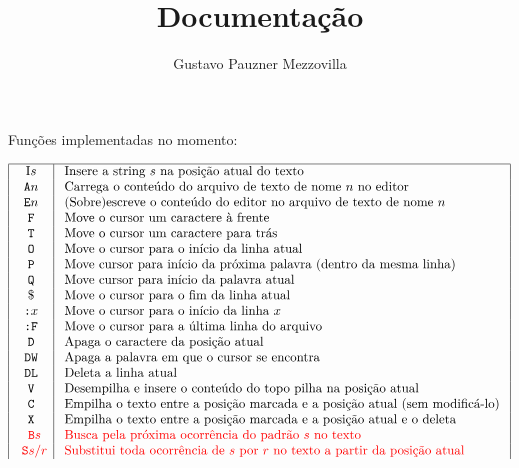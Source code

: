 \documentclass{article}
\title{Documentação}
\author{Gustavo Pauzner Mezzovilla}
\begin{document}
\maketitle

Funções implementadas no momento:

$$
\begin{array}{|c|l|}
\hline \text {I}s & \text { Insere a string } s \text { na posição atual do texto } \\
\texttt {A}n & \text { Carrega o conteúdo do arquivo de texto de nome } n \text { no editor } \\
\texttt{E}n & \text { (Sobre)escreve o conteúdo do editor no arquivo de texto de nome } n \\
\texttt{ F } & \text { Move o cursor um caractere à frente } \\
\texttt{ T } & \text { Move o cursor um caractere para trás } \\
\texttt{O} & \text { Move o cursor para o início da linha atual } \\
\texttt{P} & \text { Move cursor para início da próxima palavra (dentro da mesma linha) } \\
\texttt{ Q } & \text { Move cursor para início da palavra atual } \\
\$ & \text { Move o cursor para o fim da linha atual } \\
\texttt{:}x & \text { Move o cursor para o início da linha } x \\
\texttt{:F} & \text { Move o cursor para a última linha do arquivo } \\
\texttt{D} & \text { Apaga o caractere da posição atual } \\
\texttt{DW} & \text { Apaga a palavra em que o cursor se encontra } \\
\texttt{DL} & \text { Deleta a linha atual } \\
\texttt{ V } & \text { Desempilha e insere o conteúdo do topo pilha na posição atual } \\
\texttt{ C } & \text { Empilha o texto entre a posição marcada e a posição atual (sem modificá-lo) } \\
\texttt{ X } & \text { Empilha o texto entre a posição marcada e a posição atual e o deleta } \\
\color{red}\texttt{ B}s & \color{red}\text { Busca pela próxima ocorrência do padrão } s \text { no texto } \\
\color{red}\texttt{ S}s/r & \color{red}\text { Substitui toda ocorrência de } s \text { por } r \text { no texto a partir da posição atual } \\

\end{array}$$
\end{document}
